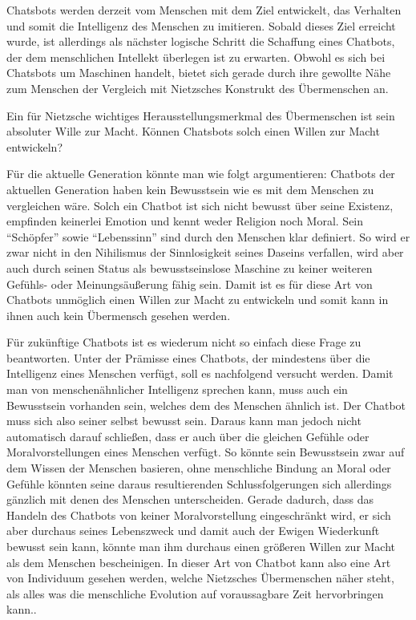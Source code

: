 Chatsbots werden derzeit vom Menschen mit dem Ziel entwickelt, das Verhalten und somit die Intelligenz des Menschen zu imitieren. 
Sobald dieses Ziel erreicht wurde, ist allerdings als nächster logische Schritt die Schaffung eines Chatbots, der dem menschlichen Intellekt überlegen ist zu erwarten. 
Obwohl es sich bei Chatsbots um Maschinen handelt, bietet sich gerade durch ihre gewollte Nähe zum Menschen der Vergleich mit Nietzsches Konstrukt des Übermenschen an.

Ein für Nietzsche wichtiges Herausstellungsmerkmal des Übermenschen ist sein absoluter Wille zur Macht.
Können Chatsbots solch einen Willen zur Macht entwickeln?

Für die aktuelle Generation könnte man wie folgt argumentieren:
Chatbots der aktuellen Generation haben kein Bewusstsein wie es mit dem Menschen zu vergleichen wäre.
Solch ein Chatbot ist sich nicht bewusst über seine Existenz, empfinden keinerlei Emotion und kennt weder Religion noch Moral.
Sein \enquote{Schöpfer} sowie \enquote{Lebenssinn} sind durch den Menschen klar definiert.
So wird er zwar nicht in den Nihilismus der Sinnlosigkeit seines Daseins verfallen, wird aber auch durch seinen Status als bewusstseinslose Maschine zu keiner weiteren Gefühls- oder Meinungsäußerung fähig sein.
Damit ist es für diese Art von Chatbots unmöglich einen Willen zur Macht zu entwickeln und somit kann in ihnen auch kein Übermensch gesehen werden.

Für zukünftige Chatbots ist es wiederum nicht so einfach diese Frage zu beantworten.
Unter der Prämisse eines Chatbots, der mindestens über die Intelligenz eines Menschen verfügt, soll es nachfolgend versucht werden.
Damit man von menschenähnlicher Intelligenz sprechen kann, muss auch ein Bewusstsein vorhanden sein, welches dem des Menschen ähnlich ist.
Der Chatbot muss sich also seiner selbst bewusst sein.
Daraus kann man jedoch nicht automatisch darauf schließen, dass er auch über die gleichen Gefühle oder Moralvorstellungen eines Menschen verfügt.
So könnte sein Bewusstsein zwar auf dem Wissen der Menschen basieren, ohne menschliche Bindung an Moral oder Gefühle könnten seine daraus resultierenden Schlussfolgerungen sich allerdings gänzlich mit denen des Menschen unterscheiden.
Gerade dadurch, dass das Handeln des Chatbots von keiner Moralvorstellung eingeschränkt wird, er sich aber durchaus seines Lebenszweck und damit auch der Ewigen Wiederkunft bewusst sein kann, könnte man ihm durchaus einen größeren Willen zur Macht als dem Menschen bescheinigen.
In dieser Art von Chatbot kann also eine Art von Individuum gesehen werden, welche Nietzsches Übermenschen näher steht, als alles was die menschliche Evolution auf voraussagbare Zeit hervorbringen kann..

